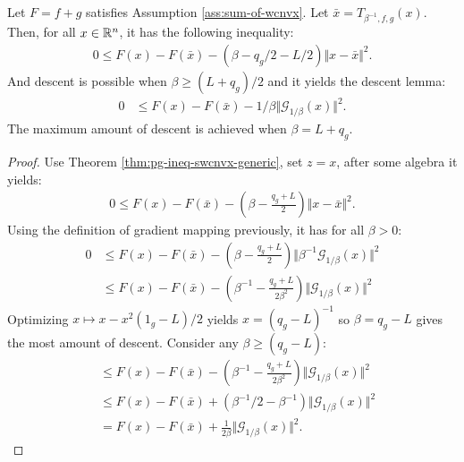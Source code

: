 \documentclass[12pt]{report}
\begin{document}
            \begin{lemma}\;\label{lemma:mono-wcnvx-descent}\\
                Let $F = f + g$ satisfies Assumption \ref{ass:sum-of-wcnvx}. 
                Let $\bar x = T_{\beta^{-1}, f, g}(x)$. 
                Then, for all $x \in \mathbb R^n$, it has the following inequality: 
                $$
                \begin{aligned}
                    0 \le F(x) - F(\bar x) - (\beta - q_g/2 - L/2)\Vert x - \bar x\Vert^2. 
                \end{aligned}
                $$
                And descent is possible when $\beta \ge (L + q_g)/2$ and it yields the descent lemma: 
                \begin{align*}
                    0 &\le F(x) - F(\bar x) - 1/\beta \Vert \mathcal G_{1/\beta}(x)\Vert^2. 
                \end{align*}
                The maximum amount of descent is achieved when $\beta = L + q_g$. 
            \end{lemma}
            \begin{proof}
                Use Theorem \ref{thm:pg-ineq-swcnvx-generic}, set $z = x$, after some algebra it yields: 
                \begin{align*}
                    0 \le F(x) - F(\bar x) - \left(
                        \beta - \frac{q_g + L}{2}
                    \right)\Vert x - \bar x\Vert^2. 
                \end{align*}
                Using the definition of gradient mapping previously, it has for all $\beta > 0$: 
                \begin{align*}
                    0 &\le F(x) - F(\bar x) - \left(
                        \beta - \frac{q_g + L}{2}
                    \right)\Vert \beta^{-1}\mathcal G_{1/\beta}(x) \Vert^2
                    \\
                    &\le F(x) - F(\bar x) - \left(
                        \beta^{-1} - \frac{q_g + L}{2\beta^2}
                    \right)\Vert\mathcal G_{1/\beta}(x) \Vert^2
                \end{align*}
                Optimizing $x\mapsto x - x^2(1_g - L)/2$ yields $x = (q_g - L)^{-1}$ so $\beta = q_g - L$ gives the most amount of descent. 
                Consider any $\beta \ge (q_g - L)$: 
                \begin{align*}
                    &\le F(x) - F(\bar x) - \left(
                        \beta^{-1} - \frac{q_g + L}{2\beta^2}
                    \right)\Vert\mathcal G_{1/\beta}(x) \Vert^2
                    \\
                    &\le F(x) - F(\bar x) + \left(
                        \beta^{-1}/2 - \beta^{-1}
                    \right)\Vert\mathcal G_{1/\beta}(x) \Vert^2
                    \\
                    &= 
                    F(x) - F(\bar x) + \frac{1}{2\beta}\Vert\mathcal G_{1/\beta}(x) \Vert^2. 
                \end{align*}
            \end{proof}
\end{document}
